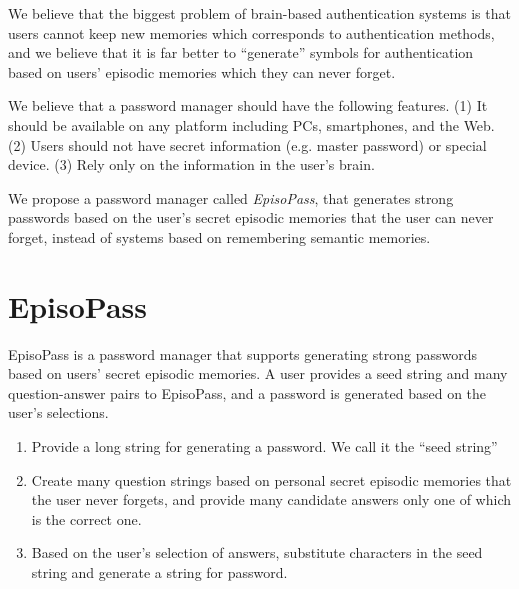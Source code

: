 \documentclass{article}
\begin{document}
We believe that the biggest problem of brain-based authentication systems is that
users cannot keep new memories which corresponds to authentication methods,
and we believe that
it is far better to ``generate'' symbols for authentication based on
users' episodic memories which they can never forget.

We believe that a password manager should have the following features.
(1) It should be available on any platform including PCs, smartphones, and the Web.
(2) Users should not have secret information (e.g. master password) or special device.
(3) Rely only on the information in the user's brain.

We propose a password manager called \textit{EpisoPass}, that generates strong passwords
based on the user's secret episodic memories that the user can never forget,
instead of systems based on remembering semantic memories.

\section{EpisoPass}

EpisoPass is a password manager that supports generating
strong passwords based on users' secret episodic memories.
A user provides a seed string and many question-answer pairs to EpisoPass,
and a password is generated based on the user's selections.

\begin{enumerate}
\item Provide a long string for generating a password.
We call it the ``seed string''

\item Create many question strings based on personal
secret episodic memories that the user never forgets,
and provide many candidate answers only one of which is the correct one.


\item Based on the user's selection of answers,
substitute characters in the seed string and generate a
string for password.


\end{enumerate}
\end{document}
